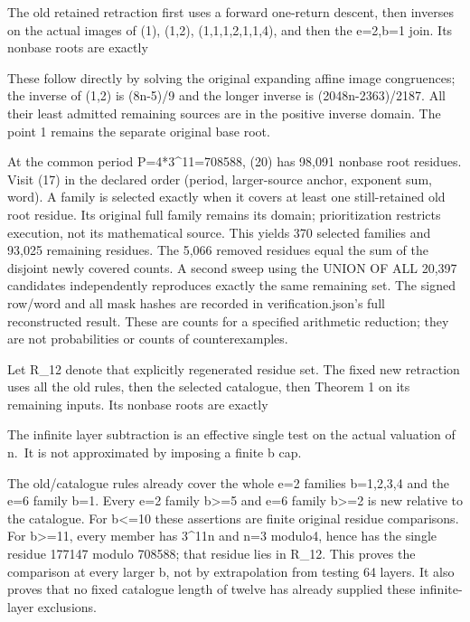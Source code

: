 The old retained retraction first uses a forward one-return descent,
then inverses on the actual images of (1), (1,2), (1,1,1,2,1,1,4), and
then the e=2,b=1 join. Its nonbase roots are exactly


These follow directly by solving the original expanding affine image
congruences; the inverse of (1,2) is (8n-5)/9 and the longer inverse is
(2048n-2363)/2187. All their least admitted remaining sources are in the
positive inverse domain. The point 1 remains the separate original base
root.

At the common period P=4*3\^{}11=708588, (20) has 98,091 nonbase root
residues. Visit (17) in the declared order (period, larger-source
anchor, exponent sum, word). A family is selected exactly when it covers
at least one still-retained old root residue. Its original full family
remains its domain; prioritization restricts execution, not its
mathematical source. This yields 370 selected families and 93,025
remaining residues. The 5,066 removed residues equal the sum of the
disjoint newly covered counts. A second sweep using the UNION OF ALL
20,397 candidates independently reproduces exactly the same remaining
set. The signed row/word and all mask hashes are recorded in
verification.json's full reconstructed result. These are counts for a
specified arithmetic reduction; they are not probabilities or counts of
counterexamples.

Let R\_12 denote that explicitly regenerated residue set. The fixed new
retraction uses all the old rules, then the selected catalogue, then
Theorem 1 on its remaining inputs. Its nonbase roots are exactly


The infinite layer subtraction is an effective single test on the actual
valuation of n.~It is not approximated by imposing a finite b cap.

The old/catalogue rules already cover the whole e=2 families b=1,2,3,4
and the e=6 family b=1. Every e=2 family b\textgreater=5 and e=6 family
b\textgreater=2 is new relative to the catalogue. For b\textless=10
these assertions are finite original residue comparisons. For
b\textgreater=11, every member has 3\^{}11\textbar n and n=3 modulo4,
hence has the single residue 177147 modulo 708588; that residue lies in
R\_12. This proves the comparison at every larger b, not by
extrapolation from testing 64 layers. It also proves that no fixed
catalogue length of twelve has already supplied these infinite-layer
exclusions.

